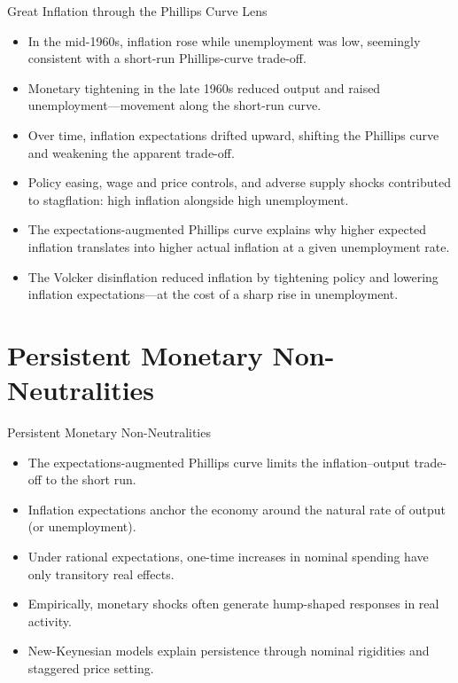 \documentclass[11pt,aspectratio=169]{beamer}
\begin{document}
\begin{frame}{Great Inflation through the Phillips Curve Lens}
\small
\begin{itemize}
    \item In the mid-1960s, inflation rose while unemployment was low, seemingly consistent with a short-run Phillips-curve trade-off.

    \item Monetary tightening in the late 1960s reduced output and raised unemployment—movement along the short-run curve.

    \item Over time, inflation expectations drifted upward, shifting the Phillips curve and weakening the apparent trade-off.

    \item Policy easing, wage and price controls, and adverse supply shocks contributed to stagflation: high inflation alongside high unemployment.

    \item The expectations-augmented Phillips curve explains why higher expected inflation translates into higher actual inflation at a given unemployment rate.

    \item The Volcker disinflation reduced inflation by tightening policy and lowering inflation expectations—at the cost of a sharp rise in unemployment.
\end{itemize}
\end{frame}
\section{Persistent Monetary Non-Neutralities}
\label{PN}

\begin{frame}{Persistent Monetary Non-Neutralities}
\small
\begin{itemize}
    \item The expectations-augmented Phillips curve limits the inflation--output trade-off to the short run.
    \item Inflation expectations anchor the economy around the natural rate of output (or unemployment).
    \item Under rational expectations, one-time increases in nominal spending have only transitory real effects.
    \item Empirically, monetary shocks often generate hump-shaped responses in real activity.
    \item New-Keynesian models explain persistence through nominal rigidities and staggered price setting.
\end{itemize}
\end{frame}
\end{document}
